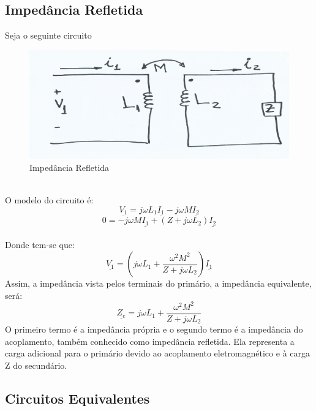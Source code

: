 \documentclass[a4paper, 12pt]{article}
\begin{document}
		\subsection{Impedância Refletida}
		Seja o seguinte circuito
		\begin{figure}[h]
			\centering
			\includegraphics[scale=0.4]{a13.png}
			\caption{Impedância Refletida}
		\end{figure}\\
		O modelo do circuito é:
		\begin{equation}
			\underline{V_1} = j\omega L_1 \underline{I_1} - j\omega M \underline{I_2}
		\end{equation}
		\begin{equation}
			0 = -j\omega M \underline{I_1} + (Z + j \omega L_2)\underline{I_2}
		\end{equation}\\
		Donde tem-se que:
		\begin{equation}
			\underline{V_1} = (j\omega L_1 + \frac{\omega^2 M^2}{Z + j\omega L_2})\underline{I_1}
		\end{equation}
		Assim, a impedância vista pelos terminais do primário, a impedância equivalente, será:
		\begin{equation}
			\underline{Z_e} = j\omega L_1 + \frac{\omega^2 M^2}{Z + j\omega L_2}
			\label{eq}
		\end{equation}
		O primeiro termo é a impedância própria e o segundo termo é a impedância do acoplamento, também conhecido como impedância refletida. Ela representa a carga adicional para o primário devido ao acoplamento eletromagnético e à carga Z do secundário.
		
	\subsection{Circuitos Equivalentes}
\end{document}
